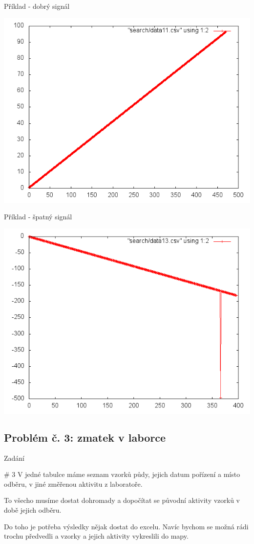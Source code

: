 \documentclass{beamer}
\begin{document}
\begin{frame}{Příklad - dobrý signál}
  \begin{center}
      \includegraphics[width=0.6\columnwidth]{search_good}
      \end{center}
\end{frame}
\begin{frame}{Příklad - špatný signál}
  \begin{center}
      \includegraphics[width=0.6\columnwidth]{search_bad}
      \end{center}
\end{frame}


\subsection{Problém č. 3: zmatek v laborce}

\begin{frame}{Zadání}
  \begin{block}{\# 3}
    V jedné tabulce máme seznam vzorků půdy, jejich datum pořízení a místo odběru, v jiné změřenou aktivitu z laboratoře.

    To všecho musíme dostat dohromady a dopočítat se původní aktivity vzorků v době jejich odběru.

    Do toho je potřeba výsledky nějak dostat do excelu. Navíc bychom se možná rádi trochu předvedli a vzorky a jejich aktivity vykreslili do mapy.
  \end{block}
\end{frame}
\end{document}
